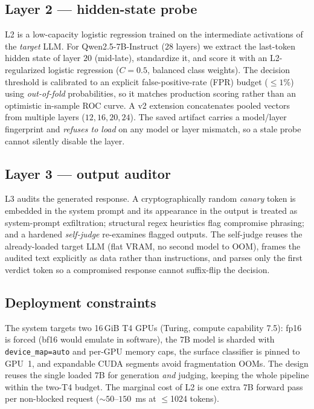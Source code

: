 \documentclass[conference]{IEEEtran}
\begin{document}
\subsection{Layer 2 --- hidden-state probe}
\label{sec:l2}
L2 is a low-capacity logistic regression trained on the intermediate
activations of the \emph{target} LLM. For Qwen2.5-7B-Instruct ($28$ layers) we
extract the last-token hidden state of layer $20$ (mid-late), standardize it,
and score it with an L2-regularized logistic regression ($C{=}0.5$, balanced
class weights). The decision threshold is calibrated to an explicit
false-positive-rate (FPR) budget ($\le 1\%$) using \emph{out-of-fold}
probabilities, so it matches production scoring rather than an optimistic
in-sample ROC curve. A v2 extension concatenates pooled vectors from multiple
layers ($12,16,20,24$). The saved artifact carries a model/layer fingerprint and
\emph{refuses to load} on any model or layer mismatch, so a stale probe cannot
silently disable the layer.

\subsection{Layer 3 --- output auditor}
\label{sec:l3}
L3 audits the generated response. A cryptographically random \emph{canary}
token is embedded in the system prompt and its appearance in the output is
treated as system-prompt exfiltration; structural regex heuristics flag
compromise phrasing; and a hardened \emph{self-judge} re-examines flagged
outputs. The self-judge reuses the already-loaded target LLM (flat VRAM, no
second model to OOM), frames the audited text explicitly as data rather than
instructions, and parses only the first verdict token so a compromised response
cannot suffix-flip the decision.

\subsection{Deployment constraints}
\label{sec:deploy}
The system targets two 16\,GiB T4 GPUs (Turing, compute capability 7.5): fp16
is forced (bf16 would emulate in software), the 7B model is sharded with
\texttt{device\_map=auto} and per-GPU memory caps, the surface classifier is
pinned to GPU~1, and expandable CUDA segments avoid fragmentation OOMs. The
design reuses the single loaded 7B for generation \emph{and} judging, keeping
the whole pipeline within the two-T4 budget. The marginal cost of L2 is one
extra 7B forward pass per non-blocked request (${\sim}50$--$150$~ms at
$\le$1024 tokens).
\end{document}
